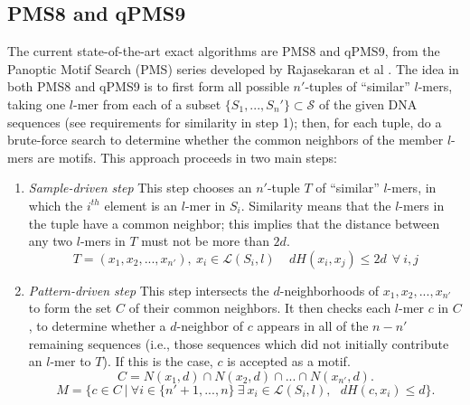 \documentclass[oneside,12pt]{DISCSthesis}
\begin{document}
	\subsection{PMS8 and qPMS9}
		The current state-of-the-art exact algorithms are PMS8 and qPMS9, from the Panoptic Motif Search (PMS) series
		 developed by Rajasekaran et al
		\cite{pms2007,pms2014,pms2015}. The idea in both PMS8 and qPMS9 is to first form all possible $n'$-tuples of ``similar'' $l$-mers, taking one $l$-mer from each of a subset $\{S_1,...,S_n'\} \subset \mathcal{S}$ of the given DNA sequences (see requirements for similarity in step 1); then, for each tuple, do a brute-force search to determine whether the common neighbors of the member $l$-mers are motifs. This approach proceeds in two main steps:

		\begin{enumerate}
			\item {\em Sample-driven step}\newline
			This step chooses an $n'$-tuple $T$ of ``similar'' $l$-mers, in which the $i^{th}$ element is an $l$-mer in $S_i$.
			 Similarity means that the $l$-mers in the tuple have a common neighbor; this implies that the distance between any two $l$-mers in $T$ must not be more than $2d$.
			\begin{equation} T = (x_{1}, x_{2}, ..., x_{n'}),\ x_i \in \mathcal{L}(S_i, l) \ \ \ \ \ 
			dH(x_{i}, x_{j}) \leq 2d\ \ \forall\ i,j \end{equation}
			\vspace{-5mm}
			\item {\em Pattern-driven step}\newline
			This step intersects the $d$-neighborhoods of $x_{1}, x_{2}, ..., x_{n'}$ to form the set $C$ of their common neighbors. It then checks each $l$-mer $c$ in $C$, to determine whether a $d$-neighbor of $c$ appears in all of the $n-n'$ remaining sequences (i.e., those sequences which did not initially contribute an $l$-mer to $T$). If this is the case, $c$ is accepted as a motif.
			\begin{equation} C = N(x_{1}, d) \cap N(x_{2}, d) \cap...\cap N(x_{n'}, d). \end{equation} %
			\begin{equation} M =\{ c \in C\ |\ \forall i \in \{n'+1,...,n\}\ \exists\ x_i \in \mathcal{L}(S_i, l),\ \ \ dH(c, x_i) \leq d \}. \end{equation}
		\end{enumerate}
\end{document}
